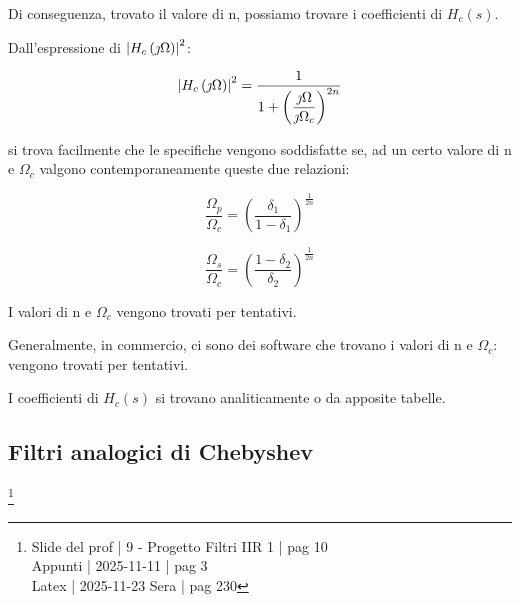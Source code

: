 Di conseguenza, trovato il valore di n, possiamo trovare i coefficienti di $H_c \left(s\right)$. \newline 

Dall'espressione di $\abs{H_c \left(\jmath \Omega\right)}^{2}$:  

{
    \Large 
    \begin{equation}
        \abs{H_c \left(\jmath \Omega\right)}^{2} 
        = 
        \dfrac{1}{1 + \left( \dfrac{\jmath \Omega}{\jmath \Omega_c}\right)^{2n}}
    \end{equation}
}

si trova facilmente che le specifiche vengono soddisfatte se, ad un certo valore di n e $\Omega_c$ valgono contemporaneamente queste due relazioni: 

{
    \Large 
    \begin{equation}
        \dfrac{\Omega_p}{\Omega_c}
        = 
        \left(
            \dfrac{\delta_1}{1 - \delta_1}
        \right)^{\frac{1}{2n}}
    \end{equation}
}

{
    \Large 
    \begin{equation}
        \dfrac{\Omega_s}{\Omega_c}
        = 
        \left(
            \dfrac{1 - \delta_2}{\delta_2}
        \right)^{\frac{1}{2n}}
    \end{equation}
}

I valori di n e $\Omega_c$ vengono trovati per tentativi. \newline 


\begin{tcolorbox}
    Generalmente, in commercio, ci sono dei software che trovano i valori di n e $\Omega_c$: vengono trovati per tentativi. 
\end{tcolorbox}

I coefficienti di $H_c \left(s\right)$ si trovano analiticamente o da apposite tabelle. \newline 

\newpage 

\subsection{Filtri analogici di Chebyshev} \label{subsec: Filtri analogici di Chebyshev}

\footnote{ 
    Slide del prof | 9 - Progetto Filtri IIR 1 | pag 10\\ 
    Appunti | 2025-11-11 | pag 3  \\ 
    Latex | 2025-11-23 Sera | pag 230 
} 


